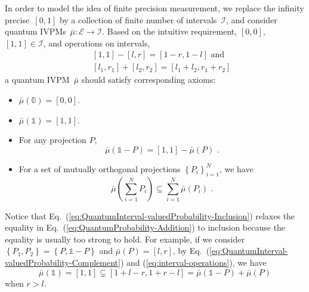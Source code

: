 \documentclass[english,reprint, aps, prl,superscriptaddress, showpacs,
showkeys]{revtex4-1}
\theoremstyle{plain}
\theoremstyle{definition}
\newcommand{\events}{\ensuremath{\mathcal{E}}}
\begin{document}
In order to model the idea of finite precision measurement, we replace
the infinity precise~$[0,1]$ by a collection of finite number of
intervals~$\mathscr{I}$, and consider quantum IVPMs~$\bar{\mu}:\events\rightarrow\mathscr{I}$.
Based on the intuitive requirement, $\left[0,0\right]$, $\left[1,1\right]\in\mathscr{I}$,
and operations on intervals,\begin{subequations}\label{eq:interval-operations}
\begin{eqnarray}
 &  & \left[1,1\right]-\left[l,r\right]=\left[1-r,1-l\right]\textrm{ and}\\
 &  & [l_{1},r_{1}]+[l_{2},r_{2}]=[l_{1}+l_{2},r_{1}+r_{2}]
\end{eqnarray}
\end{subequations}a quantum IVPM~$\bar{\mu}$ should satisfy corresponding
axioms:
\begin{itemize}
\item $\bar{\mu}(\mathbb{0})=\left[0,0\right]$. 
\item $\bar{\mu}(\mathbb{1})=\left[1,1\right]$. 
\item For any projection $P$, 
\begin{equation}
\bar{\mu}\left(\mathbb{1}-P\right)=\left[1,1\right]-\bar{\mu}\left(P\right)\textrm{ .}\label{eq:QuantumInterval-valuedProbability-Complement}
\end{equation}
\item For a set of mutually orthogonal projections $\left\{ P_{i}\right\} _{i=1}^{N}$,
we have 
\begin{equation}
\bar{\mu}\left(\sum_{i=1}^{N}P_{i}\right)\subseteq\sum_{i=1}^{N}\bar{\mu}\left(P_{i}\right)\textrm{ .}\label{eq:QuantumInterval-valuedProbability-Inclusion}
\end{equation}
\end{itemize}
Notice that Eq.~(\ref{eq:QuantumInterval-valuedProbability-Inclusion})
relaxes the equality in Eq.~(\ref{eq:QuantumProbability-Addition})
to inclusion because the equality is usually too strong to hold. For
example, if we consider $\left\{ P_{1},P_{2}\right\} =\left\{ P,\mathbb{1}-P\right\} $
and $\bar{\mu}\left(P\right)=\left[l,r\right]$, by Eq.~(\ref{eq:QuantumInterval-valuedProbability-Complement})
and (\ref{eq:interval-operations}), we have 
\[
\bar{\mu}(\mathbb{1})=\left[1,1\right]\subsetneq\left[1+l-r,1+r-l\right]=\bar{\mu}\left(\mathbb{1}-P\right)+\bar{\mu}\left(P\right)
\]
when $r>l$.
\end{document}

